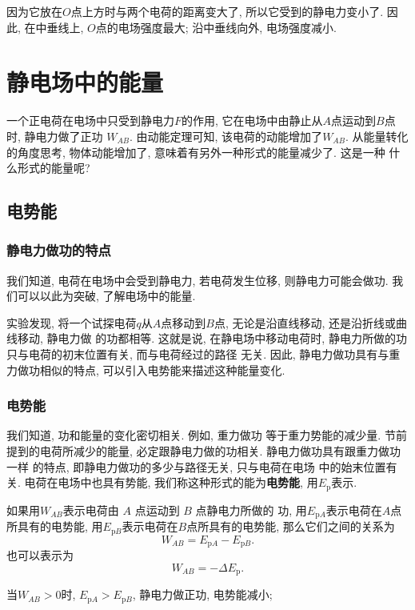 \documentclass[11pt,a4paper]{ctexbook}
\begin{document}
因为它放在$O$点上方时与两个电荷的距离变大了, 所以它受到的静电力变小了. 因此, 在中垂线上,
$O$点的电场强度最大; 沿中垂线向外, 电场强度减小.

\section{静电场中的能量}

一个正电荷在电场中只受到静电力$F$的作用,
它在电场中由静止从$A$点运动到$B$点时, 静电力做了正功
$W_{AB}$. 由动能定理可知, 该电荷的动能增加了$W_{AB}$.
从能量转化的角度思考, 物体动能增加了,
意味着有另外一种形式的能量减少了. 这是一种
什么形式的能量呢?
\subsection{电势能}

\subsubsection{静电力做功的特点}
\label{section: 静电力做功的特点}

我们知道, 电荷在电场中会受到静电力, 若电荷发生位移, 则静电力可能会做功. 我们可以以此为突破,
了解电场中的能量.

实验发现, 将一个试探电荷$q$从$A$点移动到$B$点, 无论是沿直线移动, 还是沿折线或曲线移动, 静电力做
的功都相等. 这就是说, 在静电场中移动电荷时, 静电力所做的功只与电荷的初末位置有关, 而与电荷经过的路径
无关. 因此, 静电力做功具有与重力做功相似的特点, 可以引入电势能来描述这种能量变化.

\subsubsection{电势能}

我们知道, 功和能量的变化密切相关. 例如, 重力做功
等于重力势能的减少量. 节前提到的电荷所减少的能量,
必定跟静电力做的功相关. 静电力做功具有跟重力做功一样
的特点, 即静电力做功的多少与路径无关, 只与电荷在电场
中的始末位置有关. 电荷在电场中也具有势能, 我们称这种形式的能为\textbf{电势能}, 用$E_\text{p}$表示.

如果用$W_{AB}$表示电荷由 $A$ 点运动到 $B$ 点静电力所做的
功, 用$E_{\mathrm{p}A}$表示电荷在$A$点所具有的电势能, 用$E_{\mathrm{p}B}$表示电荷在$B$点所具有的电势能,
那么它们之间的关系为
$$W_{AB} = E_{\mathrm{p}A} - E_{\mathrm{p}B}.$$
也可以表示为
$$W_{AB} = -\Delta E_\mathrm{p}.$$

当$W_{AB}>0$时, $E_{\mathrm{p}A} > E_{\mathrm{p}B}$, 静电力做正功, 电势能减小;
\end{document}
